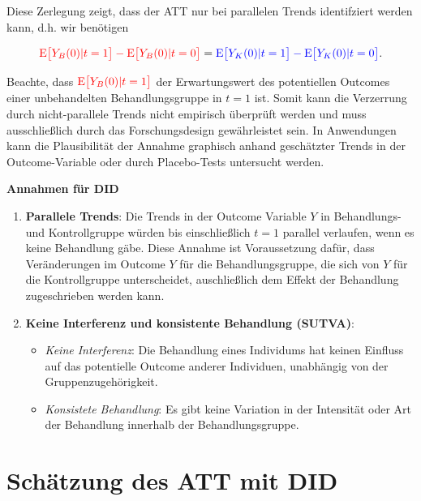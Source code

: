 \documentclass[
  a4paper,
  DIV=11,
  oneside]{scrreprt}
\begin{document}
Diese Zerlegung zeigt, dass der ATT nur bei parallelen Trends
identifziert werden kann, d.h. wir benötigen

\begin{align*}
{\color{red}\textup{E}\big[Y_B(0)\vert t=1\big] - \textup{E}\big[Y_B(0)\vert t=0\big]} = {\color{blue}\textup{E}\big[Y_K(0)\vert t=1\big] -  \textup{E}\big[Y_K(0)\vert t=0\big]}.
\end{align*}

Beachte, dass \({\color{red}\textup{E}\big[Y_B(0)\vert t=1\big]}\) der
Erwartungswert des potentiellen Outcomes einer unbehandelten
Behandlungsgruppe in \(t=1\) ist. Somit kann die Verzerrung durch
nicht-parallele Trends nicht empirisch überprüft werden und muss
ausschließlich durch das Forschungsdesign gewährleistet sein. In
Anwendungen kann die Plausibilität der Annahme graphisch anhand
geschätzter Trends in der Outcome-Variable oder durch Placebo-Tests
untersucht werden.

\textbf{Annahmen für DID}

\begin{enumerate}
\def\labelenumi{\arabic{enumi}.}
\item
  \textbf{Parallele Trends}: Die Trends in der Outcome Variable \(Y\) in
  Behandlungs- und Kontrollgruppe würden bis einschließlich \(t=1\)
  parallel verlaufen, wenn es keine Behandlung gäbe. Diese Annahme ist
  Voraussetzung dafür, dass Veränderungen im Outcome \(Y\) für die
  Behandlungsgruppe, die sich von \(Y\) für die Kontrollgruppe
  unterscheidet, auschließlich dem Effekt der Behandlung zugeschrieben
  werden kann.
\item
  \textbf{Keine Interferenz und konsistente Behandlung (SUTVA)}:

  \begin{itemize}
  \item
    \emph{Keine Interferenz}: Die Behandlung eines Individums hat keinen
    Einfluss auf das potentielle Outcome anderer Individuen, unabhängig
    von der Gruppenzugehörigkeit.
  \item
    \emph{Konsistete Behandlung}: Es gibt keine Variation in der
    Intensität oder Art der Behandlung innerhalb der Behandlungsgruppe.
  \end{itemize}
\end{enumerate}

\section{Schätzung des ATT mit DID}\label{schuxe4tzung-des-att-mit-did}
\end{document}
